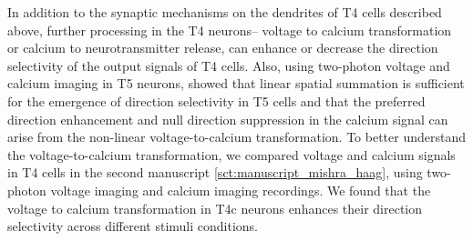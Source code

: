 In addition to the synaptic mechanisms on the dendrites of T4 cells described above, further processing in the T4 neurons– voltage to calcium transformation or calcium to neurotransmitter release, can enhance or decrease the direction selectivity of the output signals of T4 cells. Also, using two-photon voltage and calcium imaging in T5 neurons, \cite{Wienecke2018} showed that linear spatial summation is sufficient for the emergence of direction selectivity in T5 cells and that the preferred direction enhancement and null direction suppression in the calcium signal can arise from the non-linear voltage-to-calcium transformation. To better understand the voltage-to-calcium transformation, we compared voltage and calcium signals in T4 cells in the second manuscript \ref{sct:manuscript_mishra_haag}, using two-photon voltage imaging and calcium imaging recordings. We found that the voltage to calcium transformation in T4c neurons enhances their direction selectivity across different stimuli conditions.  






